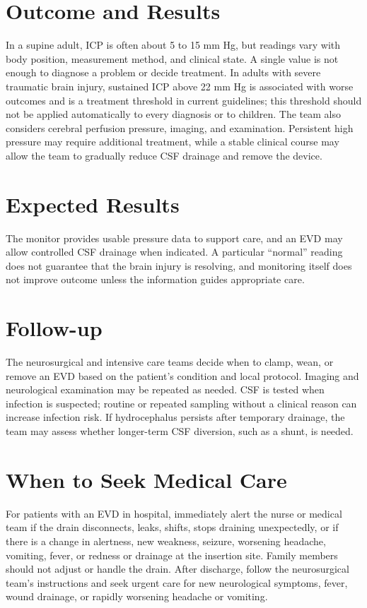 \section*{Outcome and Results}
In a supine adult, ICP is often about 5 to 15 mm Hg, but readings vary with body position, measurement method, and clinical state. A single value is not enough to diagnose a problem or decide treatment. In adults with severe traumatic brain injury, sustained ICP above 22 mm Hg is associated with worse outcomes and is a treatment threshold in current guidelines; this threshold should not be applied automatically to every diagnosis or to children. The team also considers cerebral perfusion pressure, imaging, and examination. Persistent high pressure may require additional treatment, while a stable clinical course may allow the team to gradually reduce CSF drainage and remove the device.

\section*{Expected Results}
The monitor provides usable pressure data to support care, and an EVD may allow controlled CSF drainage when indicated. A particular “normal” reading does not guarantee that the brain injury is resolving, and monitoring itself does not improve outcome unless the information guides appropriate care.

\section*{Follow-up}
The neurosurgical and intensive care teams decide when to clamp, wean, or remove an EVD based on the patient's condition and local protocol. Imaging and neurological examination may be repeated as needed. CSF is tested when infection is suspected; routine or repeated sampling without a clinical reason can increase infection risk. If hydrocephalus persists after temporary drainage, the team may assess whether longer-term CSF diversion, such as a shunt, is needed.

\section*{When to Seek Medical Care}
For patients with an EVD in hospital, immediately alert the nurse or medical team if the drain disconnects, leaks, shifts, stops draining unexpectedly, or if there is a change in alertness, new weakness, seizure, worsening headache, vomiting, fever, or redness or drainage at the insertion site. Family members should not adjust or handle the drain. After discharge, follow the neurosurgical team's instructions and seek urgent care for new neurological symptoms, fever, wound drainage, or rapidly worsening headache or vomiting.

